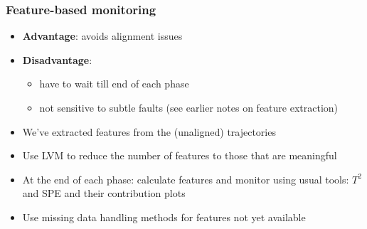 \documentclass[handout, 12pt]{beamer}
\begin{document}
\begin{frame}[label=featuremonitoring]\frametitle{Feature-based monitoring}
	
	\begin{itemize}
		\item	\textbf{Advantage}: avoids alignment issues
		
		\item	\textbf{Disadvantage}: 
		
				\begin{itemize}
					\item	have to wait till end of each phase
					
					\item	not sensitive to subtle faults (see earlier notes on feature extraction)
				\end{itemize}\pause
	\end{itemize}
	
	{\color{myOrange}{Approach}}
	\begin{itemize}
		\item	We've extracted features from the (unaligned) trajectories
		
		\item	Use LVM to reduce the number of features to those that are meaningful \pause
		
		\item	At the end of each phase: calculate features and monitor using usual tools: \( T^2 \) and SPE and their contribution plots
		
		\item	Use missing data handling methods for features not yet available
		
	\end{itemize}
\end{frame}
\end{document}
